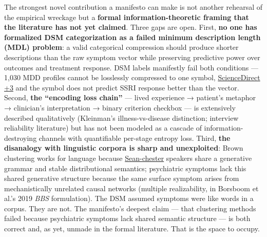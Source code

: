 The strongest novel contribution a manifesto can make is not another rehearsal of the empirical wreckage but a \textbf{formal information-theoretic framing that the literature has not yet claimed}. Three gaps are open. First, \textbf{no one has formalized DSM categorization as a failed minimum description length (MDL) problem}: a valid categorical compression should produce shorter descriptions than the raw symptom vector while preserving predictive power over outcomes and treatment response. DSM labels manifestly fail both conditions --- 1,030 MDD profiles cannot be losslessly compressed to one symbol, \href{https://www.sciencedirect.com/science/article/abs/pii/S027273582100043X}{ScienceDirect +3} and the symbol does not predict SSRI response better than the vector. Second, \textbf{the ``encoding loss chain''} --- lived experience → patient's metaphor → clinician's interpretation → binary criterion checkbox --- is extensively described qualitatively (Kleinman's illness-vs-disease distinction; interview reliability literature) but has not been modeled as a cascade of information-destroying channels with quantifiable per-stage entropy loss. Third, \textbf{the disanalogy with linguistic corpora is sharp and unexploited}: Brown clustering works for language because \href{http://sean-chester.github.io/assets/preprints/generalised-brown.pdf}{Sean-chester} speakers share a generative grammar and stable distributional semantics; psychiatric symptoms lack this shared generative structure because the same surface symptom arises from mechanistically unrelated causal networks (multiple realizability, in Borsboom et al.'s 2019 \emph{BBS} formulation). The DSM assumed symptoms were like words in a corpus. They are not. The manifesto's deepest claim --- that clustering methods failed because psychiatric symptoms lack shared semantic structure --- is both correct and, as yet, unmade in the formal literature. That is the space to occupy.
